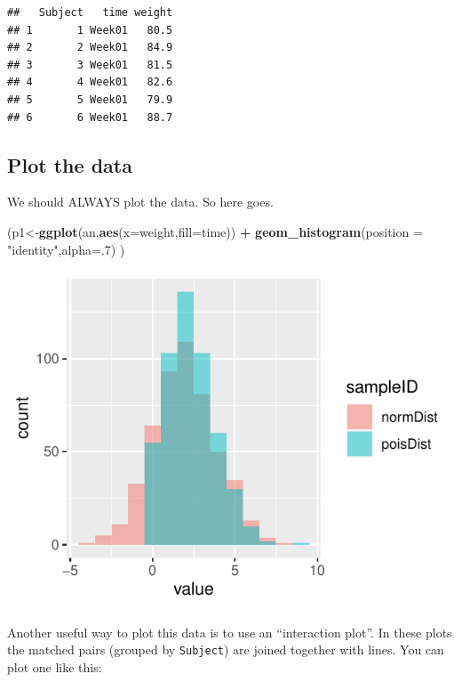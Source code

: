 \documentclass[
  a4paperpaper,
]{book}
\newenvironment{Shaded}{\begin{snugshade}}{\end{snugshade}}
\newcommand{\DataTypeTok}[1]{\textcolor[rgb]{0.13,0.29,0.53}{#1}}
\newcommand{\DecValTok}[1]{\textcolor[rgb]{0.00,0.00,0.81}{#1}}
\newcommand{\KeywordTok}[1]{\textcolor[rgb]{0.13,0.29,0.53}{\textbf{#1}}}
\newcommand{\NormalTok}[1]{#1}
\newcommand{\OperatorTok}[1]{\textcolor[rgb]{0.81,0.36,0.00}{\textbf{#1}}}
\newcommand{\StringTok}[1]{\textcolor[rgb]{0.31,0.60,0.02}{#1}}
\begin{document}
\begin{verbatim}
##   Subject   time weight
## 1       1 Week01   80.5
## 2       2 Week01   84.9
## 3       3 Week01   81.5
## 4       4 Week01   82.6
## 5       5 Week01   79.9
## 6       6 Week01   88.7
\end{verbatim}

\hypertarget{plot-the-data}{%
\subsection{Plot the data}\label{plot-the-data}}

We should ALWAYS plot the data. So here goes.

\begin{Shaded}
\begin{Highlighting}[]
\NormalTok{(p1\textless{}{-}}\KeywordTok{ggplot}\NormalTok{(an,}\KeywordTok{aes}\NormalTok{(}\DataTypeTok{x=}\NormalTok{weight,}\DataTypeTok{fill=}\NormalTok{time)) }\OperatorTok{+}
\StringTok{   }\KeywordTok{geom\_histogram}\NormalTok{(}\DataTypeTok{position =} \StringTok{"identity"}\NormalTok{,}\DataTypeTok{alpha=}\NormalTok{.}\DecValTok{7}\NormalTok{)}
\NormalTok{ )}
\end{Highlighting}
\end{Shaded}

\includegraphics{BB852_files/figure-latex/unnamed-chunk-148-1.pdf}

Another useful way to plot this data is to use an ``interaction plot''. In these plots the matched pairs (grouped by \texttt{Subject}) are joined together with lines. You can plot one like this:
\end{document}
